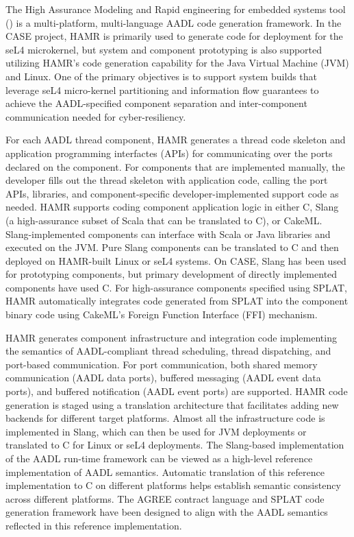 
The High Assurance Modeling and
Rapid engineering for embedded systems tool (\hamr)
\cite{hamr} is a multi-platform, multi-language
AADL code generation framework.  In the CASE project, HAMR is primarily used
to generate code for deployment for the seL4 microkernel, but system and component
prototyping is also supported utilizing HAMR's code generation capability
for the Java Virtual Machine (JVM) and Linux.  One of the
primary objectives is to support system builds that
leverage seL4 micro-kernel partitioning and information flow
guarantees to achieve the AADL-specified component separation and
inter-component communication needed for cyber-resiliency.

For each AADL thread component, HAMR generates a thread code
skeleton and application programming interfactes (APIs) for communicating over the ports declared on
the component.  For components that are implemented manually, the
developer fills out the thread skeleton with application code,
calling the port APIs, libraries, and component-specific
developer-implemented support code as needed.
HAMR supports coding component application logic in either C,
Slang~\cite{slang} (a high-assurance subset of Scala that can be translated to
C), or CakeML.  Slang-implemented components can interface with
Scala or Java libraries and executed on the JVM.  Pure Slang
components can be translated to C and then deployed on HAMR-built
Linux or seL4 systems.  On CASE, Slang has been used for prototyping
components, but primary development of directly implemented
components have used C.  For high-assurance components specified
using SPLAT, HAMR automatically integrates code generated from
SPLAT into the component binary code using CakeML's Foreign
Function Interface (FFI) mechanism.

HAMR generates component infrastructure and integration code
implementing the semantics of AADL-compliant thread scheduling,
thread dispatching, and port-based communication.
For port communication, both shared memory communication (AADL
data ports), buffered messaging (AADL event data ports), and
buffered notification (AADL event ports) are supported.
HAMR code generation is staged using a translation architecture
that facilitates adding new backends for different target
platforms.   Almost all the infrastructure code is implemented
in Slang, which can then be used for JVM deployments or
translated to C for Linux or seL4 deployments.
The Slang-based implementation of the AADL run-time framework
can be viewed as a high-level reference implementation of AADL
semantics.   Automatic translation of this reference
implementation to C on different platforms helps establish
semantic consistency across different platforms. 
The AGREE contract language and SPLAT
code generation framework have been designed to align with the AADL
semantics reflected in this reference implementation.  

